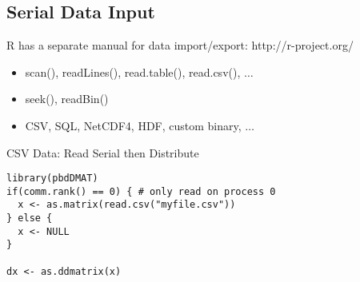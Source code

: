 \subsection{Serial Data Input}
\makesubcontentsslidessec


\begin{frame}
\begin{block}{R has a separate manual for data import/export: http://r-project.org/}
\begin{itemize}
\item scan(), readLines(), read.table(), read.csv(), $\ldots$
\item seek(), readBin()
\item CSV, SQL, NetCDF4, HDF, custom binary, $\ldots$
\end{itemize}
\end{block}
\end{frame}

\begin{frame}[fragile]
  \begin{exampleblock}{CSV Data: Read Serial then Distribute}\pause
\begin{lstlisting}[title=0\_readcsv.r]
library(pbdDMAT)
if(comm.rank() == 0) { # only read on process 0
  x <- as.matrix(read.csv("myfile.csv"))
} else {
  x <- NULL
}

dx <- as.ddmatrix(x)
\end{lstlisting}
  \end{exampleblock}
\end{frame}
